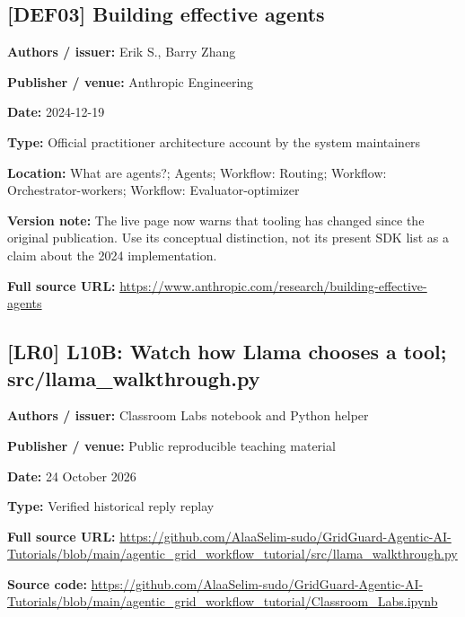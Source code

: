 \documentclass[10pt,letterpaper]{article}
\begin{document}
\subsection*{[DEF03] Building effective agents}
\textbf{Authors / issuer:} Erik S., Barry Zhang\par
\textbf{Publisher / venue:} Anthropic Engineering\par
\textbf{Date:} 2024-12-19\par
\textbf{Type:} Official practitioner architecture account by the system maintainers\par
\textbf{Location:} What are agents?; Agents; Workflow: Routing; Workflow: Orchestrator-workers; Workflow: Evaluator-optimizer\par
\textbf{Version note:} The live page now warns that tooling has changed since the original publication. Use its conceptual distinction, not its present SDK list as a claim about the 2024 implementation.\par
\textbf{Full source URL:} \href{https://www.anthropic.com/research/building-effective-agents}{\small\ttfamily https:/\allowbreak{}/\allowbreak{}www.\allowbreak{}anthropic.\allowbreak{}com/\allowbreak{}research/\allowbreak{}building-\allowbreak{}effective-\allowbreak{}agents}\par
\par\medskip
\subsection*{[LR0] L10B: Watch how Llama chooses a tool; src/llama\_walkthrough.py}
\textbf{Authors / issuer:} Classroom Labs notebook and Python helper\par
\textbf{Publisher / venue:} Public reproducible teaching material\par
\textbf{Date:} 24 October 2026\par
\textbf{Type:} Verified historical reply replay\par
\textbf{Full source URL:} \href{https://github.com/AlaaSelim-sudo/GridGuard-Agentic-AI-Tutorials/blob/main/agentic_grid_workflow_tutorial/src/llama_walkthrough.py}{\small\ttfamily https:/\allowbreak{}/\allowbreak{}github.\allowbreak{}com/\allowbreak{}AlaaSelim-\allowbreak{}sudo/\allowbreak{}GridGuard-\allowbreak{}Agentic-\allowbreak{}AI-\allowbreak{}Tutorials/\allowbreak{}blob/\allowbreak{}main/\allowbreak{}agentic\_\allowbreak{}grid\_\allowbreak{}workflow\_\allowbreak{}tutorial/\allowbreak{}src/\allowbreak{}llama\_\allowbreak{}walkthrough.\allowbreak{}py}\par
\textbf{Source code:} \href{https://github.com/AlaaSelim-sudo/GridGuard-Agentic-AI-Tutorials/blob/main/agentic_grid_workflow_tutorial/Classroom_Labs.ipynb}{\small\ttfamily https:/\allowbreak{}/\allowbreak{}github.\allowbreak{}com/\allowbreak{}AlaaSelim-\allowbreak{}sudo/\allowbreak{}GridGuard-\allowbreak{}Agentic-\allowbreak{}AI-\allowbreak{}Tutorials/\allowbreak{}blob/\allowbreak{}main/\allowbreak{}agentic\_\allowbreak{}grid\_\allowbreak{}workflow\_\allowbreak{}tutorial/\allowbreak{}Classroom\_\allowbreak{}Labs.\allowbreak{}ipynb}\par
\par\medskip
\end{document}
